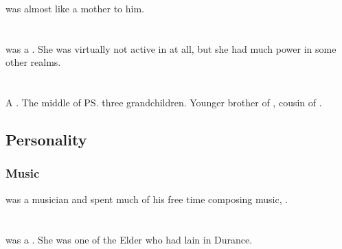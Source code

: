 \Criseis{} was almost like a mother to him. 















\section{\Skelcurmaggra}
\index{\Skelcurmaggra}
\Skelcurmaggra was a \dragon. 
She was virtually not active in \Azmith at all, but she had much power in some other realms. 

















\section{\Tentocoth}
\index{\Tentocoth}
A \dragon. 
The middle of \ps{\QuessanthIshnaruchaefir} three grandchildren. 
Younger brother of \Thiencaste, cousin of \Rathyon. 









\subsection{Personality}
\subsubsection{Music}
\Tentocoth{} was a musician and spent much of his free time composing music, . 















\section{\Thessulax}
\index{\Thessulax}
\Thessulax was a \dragon. 
She was one of the Elder \Dragons who had lain in Durance. 

